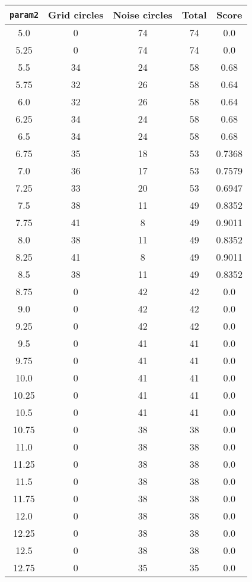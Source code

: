 \documentclass[letterpaper, 12pt]{article}
\begin{document}
\begin{longtable}{|c|c|c|c|c|}
\hline
\textbf{\texttt{param2}} & \textbf{Grid circles} & \textbf{Noise circles} & \textbf{Total} & \textbf{Score} \\
\hline
5.0 & 0 & 74 & 74 & 0.0 \\
\hline
5.25 & 0 & 74 & 74 & 0.0 \\
\hline
5.5 & 34 & 24 & 58 & 0.68 \\
\hline
5.75 & 32 & 26 & 58 & 0.64 \\
\hline
6.0 & 32 & 26 & 58 & 0.64 \\
\hline
6.25 & 34 & 24 & 58 & 0.68 \\
\hline
6.5 & 34 & 24 & 58 & 0.68 \\
\hline
6.75 & 35 & 18 & 53 & 0.7368 \\
\hline
7.0 & 36 & 17 & 53 & 0.7579 \\
\hline
7.25 & 33 & 20 & 53 & 0.6947 \\
\hline
7.5 & 38 & 11 & 49 & 0.8352 \\
\hline
7.75 & 41 & 8 & 49 & 0.9011 \\
\hline
8.0 & 38 & 11 & 49 & 0.8352 \\
\hline
8.25 & 41 & 8 & 49 & 0.9011 \\
\hline
8.5 & 38 & 11 & 49 & 0.8352 \\
\hline
8.75 & 0 & 42 & 42 & 0.0 \\
\hline
9.0 & 0 & 42 & 42 & 0.0 \\
\hline
9.25 & 0 & 42 & 42 & 0.0 \\
\hline
9.5 & 0 & 41 & 41 & 0.0 \\
\hline
9.75 & 0 & 41 & 41 & 0.0 \\
\hline
10.0 & 0 & 41 & 41 & 0.0 \\
\hline
10.25 & 0 & 41 & 41 & 0.0 \\
\hline
10.5 & 0 & 41 & 41 & 0.0 \\
\hline
10.75 & 0 & 38 & 38 & 0.0 \\
\hline
11.0 & 0 & 38 & 38 & 0.0 \\
\hline
11.25 & 0 & 38 & 38 & 0.0 \\
\hline
11.5 & 0 & 38 & 38 & 0.0 \\
\hline
11.75 & 0 & 38 & 38 & 0.0 \\
\hline
12.0 & 0 & 38 & 38 & 0.0 \\
\hline
12.25 & 0 & 38 & 38 & 0.0 \\
\hline
12.5 & 0 & 38 & 38 & 0.0 \\
\hline
12.75 & 0 & 35 & 35 & 0.0 \\

\end{longtable}
\end{document}
